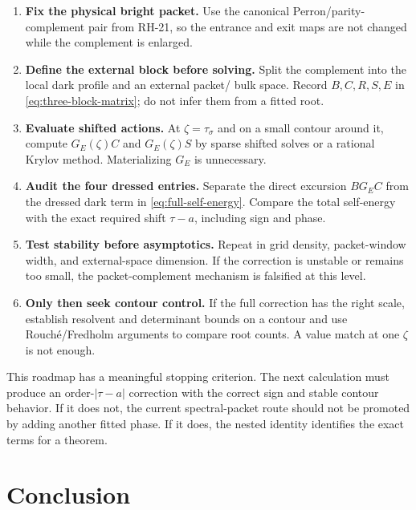 \documentclass[11pt]{article}
\theoremstyle{definition}
\theoremstyle{remark}
\begin{document}
\begin{enumerate}[label=\textbf{R\arabic*.},leftmargin=3.2em]
 \item \textbf{Fix the physical bright packet.}
 Use the canonical Perron/parity-complement pair from RH-21, so the entrance
 and exit maps are not changed while the complement is enlarged.

 \item \textbf{Define the external block before solving.}
 Split the complement into the local dark profile and an external packet/
bulk space.  Record $B,C,R,S,E$ in \eqref{eq:three-block-matrix}; do not infer
them from a fitted root.

 \item \textbf{Evaluate shifted actions.}
 At $\zeta=\tau_\sigma$ and on a small contour around it, compute
 $G_E(\zeta)C$ and $G_E(\zeta)S$ by sparse shifted solves or a rational Krylov
 method.  Materializing $G_E$ is unnecessary.

 \item \textbf{Audit the four dressed entries.}
 Separate the direct excursion $B G_E C$ from the dressed dark term in
 \eqref{eq:full-self-energy}.  Compare the total self-energy with the exact
 required shift $\tau-a$, including sign and phase.

 \item \textbf{Test stability before asymptotics.}
 Repeat in grid density, packet-window width, and external-space dimension.
 If the correction is unstable or remains too small, the packet-complement
 mechanism is falsified at this level.

 \item \textbf{Only then seek contour control.}
 If the full correction has the right scale, establish resolvent and
 determinant bounds on a contour and use Rouch\'e/Fredholm arguments to
 compare root counts.  A value match at one $\zeta$ is not enough.
\end{enumerate}

This roadmap has a meaningful stopping criterion.  The next calculation
must produce an order-$|\tau-a|$ correction with the correct sign and stable
contour behavior.  If it does not, the current spectral-packet route should
not be promoted by adding another fitted phase.  If it does, the nested
identity identifies the exact terms for a theorem.

\section{Conclusion}
\label{sec:conclusion}
\end{document}
